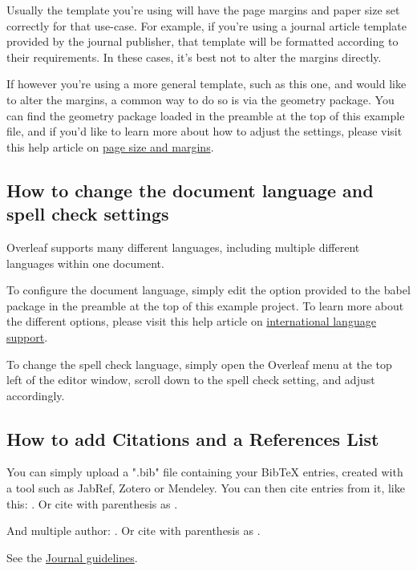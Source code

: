 \documentclass[a4paper,12pt,twoside]{article}
\begin{document}
Usually the template you're using will have the page margins and paper size set correctly for that use-case. For example, if you're using a journal article template provided by the journal publisher, that template will be formatted according to their requirements. In these cases, it's best not to alter the margins directly.

If however you're using a more general template, such as this one, and would like to alter the margins, a common way to do so is via the geometry package. You can find the geometry package loaded in the preamble at the top of this example file, and if you'd like to learn more about how to adjust the settings, please visit this help article on \href{https://www.overleaf.com/learn/latex/page_size_and_margins}{page size and margins}.

\subsection{How to change the document language and spell check settings}

Overleaf supports many different languages, including multiple different languages within one document. 

To configure the document language, simply edit the option provided to the babel package in the preamble at the top of this example project. To learn more about the different options, please visit this help article on \href{https://www.overleaf.com/learn/latex/International_language_support}{international language support}.

To change the spell check language, simply open the Overleaf menu at the top left of the editor window, scroll down to the spell check setting, and adjust accordingly.

\subsection{How to add Citations and a References List}

You can simply upload a ".bib" file containing your BibTeX entries, created with a tool such as JabRef, Zotero or Mendeley. You can then cite entries from it, like this: \cite{Bortolotti2006}. Or cite with parenthesis as \citep{Brade1956}.

And multiple author: \cite{Bortolotti2006, Minasny2006}. Or cite with parenthesis as \citep{Brade1956, Bortolotti2006, Minasny2006, Roudier2012}.

See the \href{https://www.rbcsjournal.org/instructions-to-authors/}{Journal guidelines}.
\end{document}
